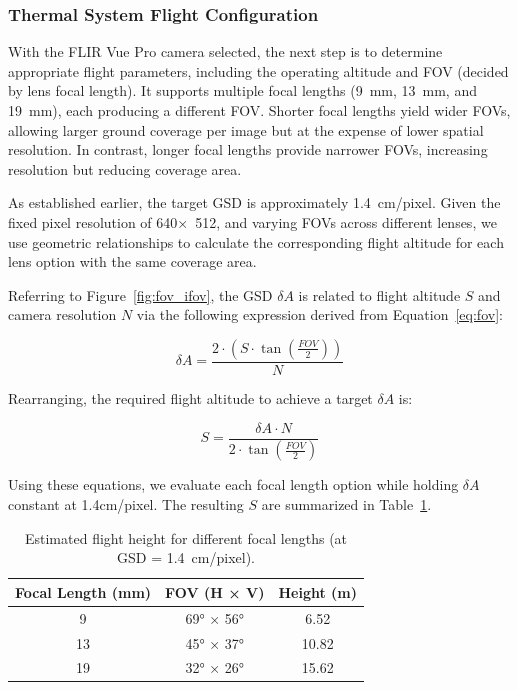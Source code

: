 \subsubsection{Thermal System Flight Configuration}\label{thermal_flight}

With the FLIR Vue Pro camera selected, the next step is to determine appropriate flight parameters, including the operating altitude and \gls{FOV} (decided by lens focal length). It supports multiple focal lengths (9~mm, 13~mm, and 19~mm), each producing a different \gls{FOV}. Shorter focal lengths yield wider \gls{FOV}s, allowing larger ground coverage per image but at the expense of lower spatial resolution. In contrast, longer focal lengths provide narrower \gls{FOV}s, increasing resolution but reducing coverage area.

As established earlier, the target \gls{GSD} is approximately 1.4~cm/pixel. Given the fixed pixel resolution of 640×~512, and varying \gls{FOV}s across different lenses, we use geometric relationships to calculate the corresponding flight altitude for each lens option with the same coverage area.

Referring to Figure~\ref{fig:fov_ifov}, the \gls{GSD} \( \delta A \) is related to flight altitude \( S \) and camera resolution \( N \) via the following expression derived from Equation~\ref{eq:fov}:

\begin{equation}
\delta A = \frac{2 \cdot (S \cdot \tan(\frac{FOV}{2}))}{N}
\end{equation}

Rearranging, the required flight altitude to achieve a target \( \delta A \)  is:

\begin{equation}
S = \frac{\delta A \cdot N}{2 \cdot \tan(\frac{FOV}{2})}
\end{equation}

Using these equations, we evaluate each focal length option while holding \( \delta A \)  constant at 1.4cm/pixel. The resulting \( S \) are summarized in Table~\ref{tab:fov_results}.

\begin{table}[htbp]
    \centering
    \small
    \renewcommand{\arraystretch}{1.2}
    \begin{tabular}{@{} c c c @{}}
        \toprule
        \textbf{Focal Length (mm)} & \textbf{FOV (H × V)} & \textbf{Height (m)} \\
        \midrule
        9  & 69° × 56° & 6.52 \\
        13 & 45° × 37° & 10.82 \\
        19 & 32° × 26° & 15.62 \\
        \bottomrule
    \end{tabular}
    \caption[Flight height vs. focal length at 1.4~cm/pixel GSD]{Estimated flight height for different focal lengths (at GSD = 1.4~cm/pixel).}
    \label{tab:fov_results}
\end{table}


